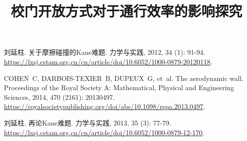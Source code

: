 \documentclass[withoutpreface,bwprint]{cumcmthesis} %
\title{校门开放方式对于通行效率的影响探究}
\begin{document}
\maketitle



\begin{thebibliography}{9}%
刘延柱.
\newblock 关于摩擦碰撞的Kane难题\allowbreak[J/OL].
\newblock 力学与实践, 2012, 34 (1): 91-94.
\newblock \url{https://lxsj.cstam.org.cn/cn/article/doi/10.6052/1000-0879-20120118}.

COHEN~C, DARBOIS-TEXIER~B, DUPEUX~G, et~al.
\newblock The aerodynamic wall\allowbreak[J/OL].
\newblock Proceedings of the Royal Society A: Mathematical, Physical and Engineering Sciences, 2014, 470 (2161): 20130497.
\newblock \url{https://royalsocietypublishing.org/doi/abs/10.1098/rspa.2013.0497}.

刘延柱.
\newblock 再论Kane难题\allowbreak[J/OL].
\newblock 力学与实践, 2013, 35 (3): 77-79.
\newblock \url{https://lxsj.cstam.org.cn/cn/article/doi/10.6052/1000-0879-12-170}.

\end{thebibliography}
\end{document}
